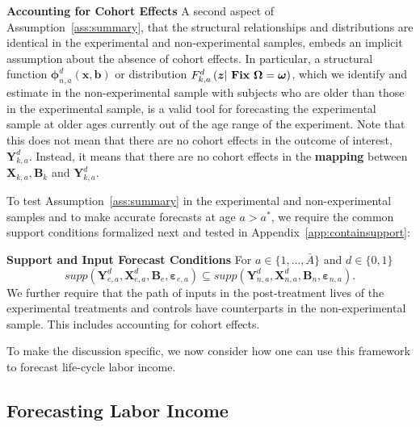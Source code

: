 \begin{remark} \label{remark:cohort} \textbf{Accounting for Cohort Effects}
A second aspect of Assumption~\ref{ass:summary}, that the structural relationships and distributions are identical in the experimental and non-experimental samples, embeds an implicit assumption about the absence of cohort effects. In particular, a structural function $\bm{\phi}_{n,a}^d \left( \bm{x}, \bm{b} \right)$ or distribution $F^d_{k,a} \left(\bm{z} | \text{ \text{\textbf{Fix}} } \bm{\Omega} = \bm{\omega}\right)$, which we identify and estimate in the non-experimental sample with subjects who are older than those in the experimental sample, is a valid tool for forecasting the experimental sample at older ages currently out of the age range of the experiment. Note that this does not mean that there are no cohort effects in the outcome of interest, $\bm{Y}^d_{k,a}$. Instead, it means that there are no cohort effects in the \textbf{mapping} between $\bm{X}_{k,a}, \bm{B}_k$ and $\bm{Y}_{k,a}^d$.
\end{remark}

\doublespacing
To test Assumption~\ref{ass:summary} in the experimental and non-experimental samples and to make accurate forecasts at age $a > a^*$, we require the common support conditions formalized next and tested in Appendix~\ref{app:containsupport}:


\onehalfspacing
\begin{assumption} \label{ass:contain} \textbf{Support and Input Forecast Conditions}
For $a \in \{ 1, \ldots, \bar{A} \}$ and $d \in \{0,1\}$
\begin{equation}
supp( \bm{Y}_{e,a}^d, \bm{X}^d_{e,a}, \bm{B}_e, \bm{\varepsilon}_{e,a} ) \subseteq supp( \bm{Y}_{n,a}^d, \bm{X}^d_{n,a}, \bm{B}_n, \bm{\varepsilon}_{n,a} ).
\end{equation}
We further require that the path of inputs in the post-treatment lives of the experimental treatments and controls have counterparts in the non-experimental sample. This includes accounting for cohort effects.
\end{assumption}

\doublespacing
To make the discussion specific, we now consider how one can use this framework to forecast life-cycle labor income.

\subsection{Forecasting Labor Income} \label{sec:forecasting}

